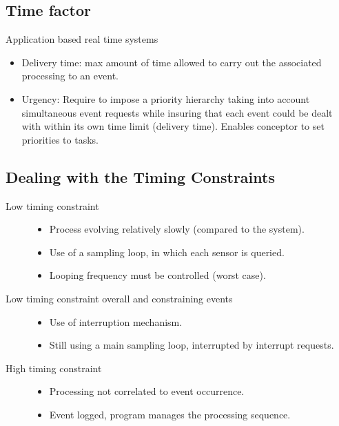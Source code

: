 \documentclass[10pt]{article}
\theoremstyle{plain}
\theoremstyle{definition}
\theoremstyle{remark}
\begin{document}
\subsection{Time factor}
Application based real time systems 
\begin{itemize}
    \item Delivery time: max amount of time allowed to carry out the associated
        processing to an event.
    \item Urgency: Require to impose a priority hierarchy taking into account
        simultaneous event requests while insuring that each event could be
        dealt with within its own time limit (delivery time). Enables conceptor
        to set priorities to tasks.
\end{itemize}

\subsection{Dealing with the Timing Constraints}
\begin{description}
    \item [Low timing constraint]
        \begin{itemize}
            \item Process evolving relatively slowly (compared to the system).
            \item Use of a sampling loop, in which  each sensor is queried.
            \item Looping frequency must be controlled (worst case).
        \end{itemize}
    \item[Low timing constraint overall and  constraining events]
        \begin{itemize}
            \item Use of interruption mechanism.
            \item Still using a main sampling loop, interrupted by interrupt
                requests.
        \end{itemize}
    \item[High timing constraint]
        \begin{itemize}
            \item Processing not correlated to event occurrence.
            \item Event logged, program manages the processing sequence.
        \end{itemize}
\end{description}
\end{document}
